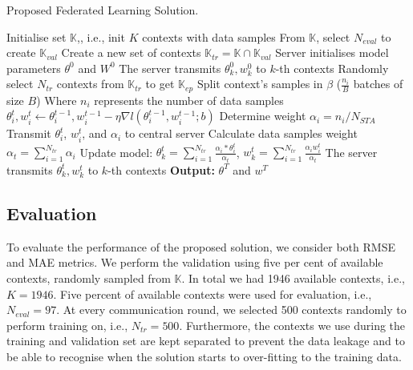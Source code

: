 \begin{algorithm}[]
 \caption{Proposed Federated Learning Solution.}
 \begin{algorithmic}[1]
    \State Initialise set $\mathbb{K}$,, i.e., init $K$ contexts with data samples
    \State From $\mathbb{K}$, select $N_{eval}$ to create $\mathbb{K}_{val}$
    \State Create a new set of contexts $\mathbb{K}_{tr} =  \mathbb{K} \cap \mathbb{K}_{val}$
    \State Server initialises model parameters $\theta^0$ and $W^0$
    \State The server transmits $\theta_k^0, w_k^0$ to $k$-th contexts
        \State Randomly select $N_{tr}$ contexts from $\mathbb{K}_{tr}$ to get $\mathbb{K}_{ep}$
        \State Split context's samples in $\beta$ ($\frac{n_i}{B}$ batches of size $B$)
        \State Where $n_i$ represents the number of data samples 
        \State  $\theta_i^t, w_i^t \leftarrow \theta_i^{t-1}, w_i^{t-1} - \eta \nabla l(\theta_i^{t-1}, w_i^{t-1};b)$
        \EndFor
        \State Determine weight $\alpha_i = n_i/N_{STA}$
        \State Transmit $\theta_i^t$, $w_i^t$, and $\alpha_i$ to central server
        \EndFor
        \State Calculate data samples weight $\alpha_{t} = \sum^{N_{tr}}_{i=1} \alpha_i$
        \State Update model: $\theta_k^t = \sum^{N_{tr}}_{i=1}  \frac{\alpha_i *\theta_i^t }{\alpha_t}$, $w_k^t = \sum^{N_{tr}}_{i=1}  \frac{\alpha_i w_i^t }{\alpha_t}$
        \State The server transmits $\theta_k^t, w_k^t$ to $k$-th contexts
    \EndFor
 \State \textbf{Output:} $\theta^T$ and $w^T$
 \end{algorithmic} \label{alg:fed}
\end{algorithm}

\subsection{Evaluation}
To evaluate the performance of the proposed solution, we consider both \ac{RMSE} and \ac{MAE} metrics. 
We perform the validation using five per cent of available contexts, randomly sampled from $\mathbb{K}$. In total we had 1946 available contexts, i.e., $K=1946$. Five percent of available contexts were  used for evaluation, i.e., $N_{eval}=97$. At every communication round, we selected 500 contexts randomly to perform training on, i.e., $N_{tr}=500$. Furthermore, the contexts we use during the training and validation set are kept separated to prevent the data leakage and to be able to recognise when the solution starts to over-fitting to the training data.

